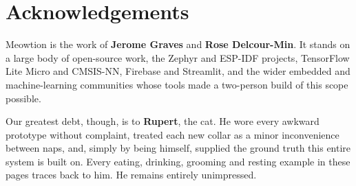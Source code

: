 {}
\section*{Acknowledgements}

Meowtion is the work of \textbf{Jerome Graves} and \textbf{Rose Delcour-Min}. It stands on a large body
of open-source work, the Zephyr and ESP-IDF projects, TensorFlow Lite Micro and CMSIS-NN, Firebase and
Streamlit, and the wider embedded and machine-learning communities whose tools made a two-person build
of this scope possible.

Our greatest debt, though, is to \textbf{Rupert}, the cat. He wore every awkward prototype without
complaint, treated each new collar as a minor inconvenience between naps, and, simply by being himself,
supplied the ground truth this entire system is built on. Every eating, drinking, grooming and resting
example in these pages traces back to him. He remains entirely unimpressed.

\clearpage

